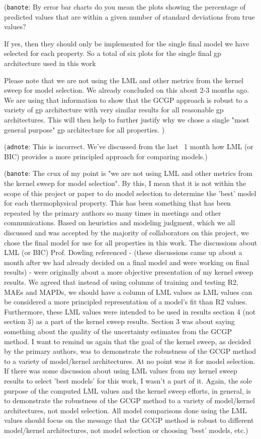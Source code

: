\documentclass[journal=jacsat,manuscript=article, ]{achemso}
\newcommand{\adnote}[1]{{\color{OliveGreen} (\texttt{adnote}: #1)}}
\newcommand{\banote}[1]{{\color{Salmon} (\texttt{banote}: #1)}}
\begin{document}
\banote{By error bar charts do you mean the plots showing the percentage of predicted values that are within a given number of standard deviations from true values?

If yes, then they should only be implemented for the single final model we have selected for each property. So a total of six plots for  the single final gp architecture used in this work

Please note that we are not using the LML and other metrics from the kernel sweep for model selection. We already concluded on this about 2-3 months ago. 
We are using that information to show that the GCGP approach is robust to a variety of gp architecture with very similar results for all reasonable gp architectures. This will then help to further justify why we chose a single "most general purpose" gp architecture for all properties. }

\adnote{This is incorrect. We've discussed from the last ~1 month how LML (or BIC) provides a more principled approach for comparing models.}

\banote{The crux of my point is "we are not using LML and other metrics from the kernel sweep for model selection". By this, I mean that it is not within the scope of this project or paper to do model selection to determine the 'best' model for each thermophysical property. This has been something that has been repeated by the primary authors so many times in meetings and other communications.  
Based on heuristics and modeling judgment, which we all discussed and was accepted by the majority of collaborators on this project, we chose the final model for use for all properties in this work. The discussions about LML (or BIC) Prof. Dowling referenced - (these discussions came up about a month after we had already decided on a final model and were working on final results) - were originally about a more objective presentation of my kernel sweep results. We agreed that instead of using columns of training and testing R2, MAEs and MAPDs, we should have a column of LML values as LML values can be considered a more principled representation of a model's fit than R2 values. Furthermore, these LML values were intended to be used in results section 4 (not section 3) as a part of the kernel sweep results. Section 3 was about saying something about the quality of the uncertainty estimates from the GCGP method.
I want to remind us again that the goal of the kernel sweep, as decided by the primary authors, was to demonstrate the robustness of the GCGP method to a variety of model/kernel architectures. At no point was it for model selection. If there was some discussion about using LML values from my kernel sweep results to select 'best models' for this work, I wasn't a part of it. Again, the sole purpose of the computed LML values and the kernel sweep efforts, in general, is to demonstrate the robustness of the GCGP method to a variety of model/kernel architectures, not model selection. All model comparisons done using the LML values should focus on the message that the GCGP method is robust to different model/kernel architectures, not model selection or choosing 'best' models, etc.}
\end{document}
